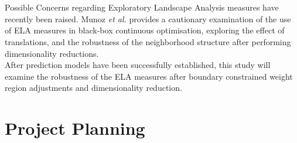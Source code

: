 \documentclass[runningheads,a4paper]{llncs}
\begin{document}
\\\\
Possible Concerns regarding Exploratory Landscape Analysis measures have recently been raised. Munoz \textit{et al.} \cite{munoz2015effects} provides a cautionary examination of the use of ELA measures in black-box continuous optimisation, exploring the effect of translations, and the robustness of the 
neighborhood structure after performing dimensionality reductions.\\After prediction models have been successfully established, this study will examine the robustness of the ELA measures after boundary constrained weight region adjustments and dimensionality reduction.

\section{Project Planning}
 
\end{document}
